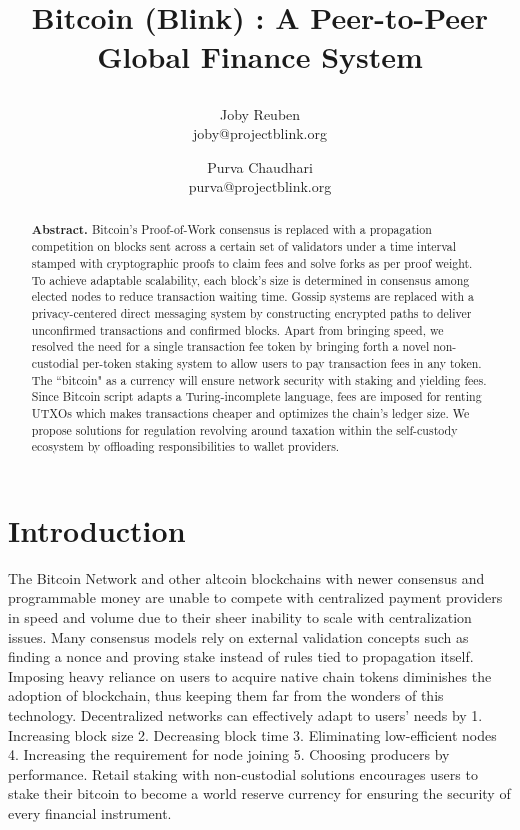 \documentclass[a4paper, 10pt]{extarticle}
\title{
 \large \textbf{Bitcoin (Blink) : A Peer-to-Peer Global Finance System}
\author{ \myfontt Joby Reuben \\ \myfontt joby@projectblink.org \and  \myfontt Purva Chaudhari \\ \myfontt purva@projectblink.org}}
\date{}
\begin{document}
\maketitle
\begin{abstract}
\noindent \textbf{Abstract.} Bitcoin's Proof-of-Work consensus is replaced with a propagation competition on blocks sent across a certain set of validators under a time interval stamped with cryptographic proofs to claim fees and solve forks as per proof weight. To achieve adaptable scalability, each block's size is determined in consensus among elected nodes to reduce transaction waiting time. Gossip systems are replaced with a privacy-centered direct messaging system by constructing encrypted paths to deliver unconfirmed transactions and confirmed blocks. Apart from bringing speed, we resolved the need for a single transaction fee token by bringing forth a novel non-custodial per-token staking system to allow users to pay transaction fees in any token. The ``bitcoin" as a currency will ensure network security with staking and yielding fees. Since Bitcoin script adapts a Turing-incomplete language, fees are imposed for renting UTXOs which makes transactions cheaper and optimizes the chain's ledger size. We propose solutions for regulation revolving around taxation within the self-custody ecosystem by offloading responsibilities to wallet providers. 
\end{abstract}
\section{Introduction}
The Bitcoin Network \cite{nakamoto2008bitcoin} and other altcoin blockchains with newer consensus and programmable money are unable to compete with centralized payment providers in speed and volume due to their sheer inability to scale with centralization issues. Many consensus models rely on external validation concepts such as finding a nonce and proving stake instead of rules tied to propagation itself. Imposing heavy reliance on users to acquire native chain tokens diminishes the adoption of blockchain, thus keeping them far from the wonders of this technology. Decentralized networks can effectively adapt to users’ needs by 1. Increasing block size 2. Decreasing block time 3. Eliminating low-efficient nodes 4. Increasing the requirement for node joining 5. Choosing producers by performance. Retail staking with non-custodial solutions encourages users to stake their bitcoin to become a world reserve currency for ensuring the security of every financial instrument.
\end{document}

